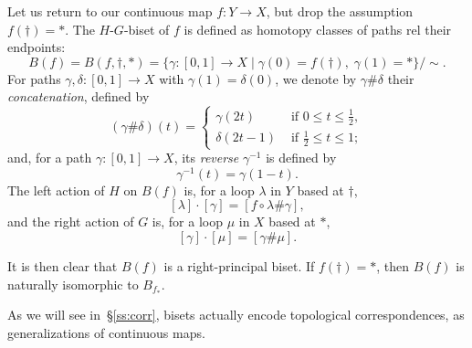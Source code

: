 \documentclass{amsart}
\begin{document}
Let us return to our continuous map $f\colon Y\to X$, but drop the
assumption $f(\dagger)=*$. The $H$-$G$-biset of $f$ is defined as
homotopy classes of paths rel their endpoints:
\begin{equation}\label{eq:DfnBisOfMap}
  B(f)=B(f,\dagger,*)=\{\gamma\colon[0,1]\to X\mid \gamma(0)=f(\dagger),\;\gamma(1)=*\}/{\sim}.
\end{equation}
For paths $\gamma,\delta\colon[0,1]\to X$ with $\gamma(1)=\delta(0)$, we
denote by $\gamma\#\delta$ their \emph{concatenation}, defined by
\[(\gamma\#\delta)(t)=\begin{cases}
  \gamma(2t) & \text{ if }0\le t\le\frac12,\\
  \delta(2t-1) & \text{ if }\frac12\le t\le1;
\end{cases}
\]
and, for a path $\gamma\colon[0,1]\to X$, its \emph{reverse} $\gamma^{-1}$
is defined by
\[\gamma^{-1}(t)=\gamma(1-t).\]
The left action of $H$ on $B(f)$ is, for a loop $\lambda$ in $Y$ based
at $\dagger$,
\[[\lambda]\cdot[\gamma]=[f\circ\lambda\#\gamma],\]
and the right action of $G$ is, for a loop $\mu$ in $X$ based at $*$,
\[[\gamma]\cdot[\mu]=[\gamma\#\mu].\]

It is then clear that $B(f)$ is a right-principal biset. If
$f(\dagger)=*$, then $B(f)$ is naturally isomorphic to $B_{f_*}$.

As we will see in~\S\ref{ss:corr}, bisets actually encode topological
correspondences, as generalizations of continuous maps.
\end{document}

